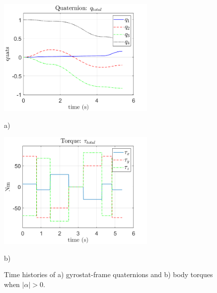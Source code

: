 \documentclass[letterpaper, paper,12pt]{AAS}		%
\begin{document}
\begin{figure}[!htb]
    \centering
    \begin{minipage}{.5\textwidth}
        \centering
\includegraphics[width=3in]{figures/alphaNot0/quats_phi_total.png}
    \caption{a)}
        \label{fig:prob1_6_2}
    \end{minipage}%
    \begin{minipage}{0.5\textwidth}
        \centering
   \includegraphics[width=3in]{figures/alphaNot0/torque_total.png}
        \label{fig:prob1_6_1}
       \caption{b)}
    \end{minipage}
    \caption{Time histories of a) gyrostat-frame quaternions and b) body torques when $|\alpha|>0$.}
    \label{fig:quats_phi_total}
	\end{figure}
	
\end{document}
